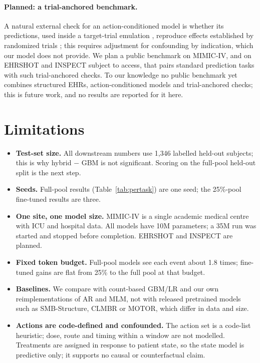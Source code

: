\documentclass[10pt,letterpaper]{article}
\begin{document}
\paragraph{Planned: a trial-anchored benchmark.}
A natural external check for an action-conditioned model is whether its
predictions, used inside a target-trial emulation \citep{hernan2016}, reproduce
effects established by randomized trials \citep{rctduplicate}; this requires
adjustment for confounding by indication, which our model does not provide. We plan a public
benchmark on MIMIC-IV, and on EHRSHOT and INSPECT subject to access, that
pairs standard prediction tasks with such trial-anchored
checks. To our knowledge no public benchmark yet combines structured EHRs,
action-conditioned models and trial-anchored checks; this is future work, and no
results are reported for it here.

\section{Limitations}
\label{sec:limits}

\begin{itemize}[leftmargin=*,itemsep=2pt,topsep=2pt]
\item \textbf{Test-set size.} All downstream numbers use 1{,}346 labelled
held-out subjects; this is why hybrid $-$ GBM is not significant. Scoring
on the full-pool held-out split is the next step.
\item \textbf{Seeds.} Full-pool results (Table~\ref{tab:pertask}) are one seed;
the 25\%-pool fine-tuned results are three.
\item \textbf{One site, one model size.} MIMIC-IV is a single academic medical
centre with ICU and hospital data. All models have 10M parameters; a 35M run was
started and stopped before completion. EHRSHOT and INSPECT are planned.
\item \textbf{Fixed token budget.} Full-pool models see each event about 1.8
times; fine-tuned gains are flat from 25\% to the full pool at that budget.
\item \textbf{Baselines.} We compare with count-based GBM/LR and our own
reimplementations of AR and MLM, not with released pretrained models such as
SMB-Structure, CLMBR or MOTOR, which differ in data and size.
\item \textbf{Actions are code-defined and confounded.} The action set is a
code-list heuristic; dose, route and timing within a window are not modelled.
Treatments are assigned in response to patient state, so the state model is
predictive only; it supports no causal or counterfactual claim.
\end{itemize}
\end{document}
